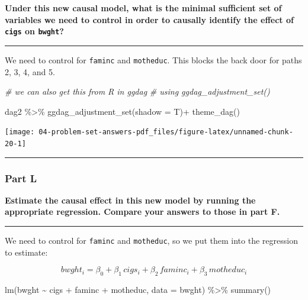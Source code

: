 \documentclass[
]{article}
\newenvironment{Shaded}{\begin{snugshade}}{\end{snugshade}}
\newcommand{\AttributeTok}[1]{\textcolor[rgb]{0.77,0.63,0.00}{#1}}
\newcommand{\CommentTok}[1]{\textcolor[rgb]{0.56,0.35,0.01}{\textit{#1}}}
\newcommand{\FunctionTok}[1]{\textcolor[rgb]{0.00,0.00,0.00}{#1}}
\newcommand{\NormalTok}[1]{#1}
\newcommand{\SpecialCharTok}[1]{\textcolor[rgb]{0.00,0.00,0.00}{#1}}
\begin{document}
\textbf{Under this new causal model, what is the minimal sufficient set
of variables we need to control in order to causally identify the effect
of \texttt{cigs} on \texttt{bwght}?}

\begin{center}\rule{0.5\linewidth}{0.5pt}\end{center}

We need to control for \texttt{faminc} and \texttt{motheduc}. This
blocks the back door for paths 2, 3, 4, and 5.

\begin{Shaded}
\begin{Highlighting}[]
\CommentTok{\# we can also get this from R in ggdag}
\CommentTok{\# using ggdag\_adjustment\_set()}

\NormalTok{dag2 }\SpecialCharTok{\%\textgreater{}\%}
  \FunctionTok{ggdag\_adjustment\_set}\NormalTok{(}\AttributeTok{shadow =}\NormalTok{ T)}\SpecialCharTok{+}
  \FunctionTok{theme\_dag}\NormalTok{()}
\end{Highlighting}
\end{Shaded}

\texttt{[image: 04-problem-set-answers-pdf\_files/figure-latex/unnamed-chunk-20-1]}

\begin{center}\rule{0.5\linewidth}{0.5pt}\end{center}

\hypertarget{part-l}{%
\subsubsection{Part L}\label{part-l}}

\textbf{Estimate the causal effect in this new model by running the
appropriate regression. Compare your answers to those in part F.}

\begin{center}\rule{0.5\linewidth}{0.5pt}\end{center}

We need to control for \texttt{faminc} and \texttt{motheduc}, so we put
them into the regression to estimate:

\[bwght_i=\beta_0+\beta_1 \, cigs_i+\beta_2 \,faminc_i+ \beta_3 \, motheduc_i\]

\begin{Shaded}
\begin{Highlighting}[]
\FunctionTok{lm}\NormalTok{(bwght }\SpecialCharTok{\textasciitilde{}}\NormalTok{ cigs }\SpecialCharTok{+}\NormalTok{ faminc }\SpecialCharTok{+}\NormalTok{ motheduc, }\AttributeTok{data =}\NormalTok{ bwght) }\SpecialCharTok{\%\textgreater{}\%} \FunctionTok{summary}\NormalTok{()}
\end{Highlighting}
\end{Shaded}
\end{document}
